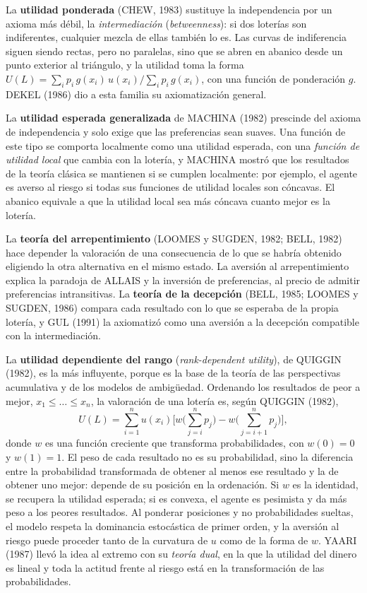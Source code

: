 \documentclass[10pt,a4paper]{article}
\begin{document}
La \textbf{utilidad ponderada} (CHEW, 1983) sustituye la independencia por un axioma más débil, la \textit{intermediación} (\textit{betweenness}): si dos loterías son indiferentes, cualquier mezcla de ellas también lo es. Las curvas de indiferencia siguen siendo rectas, pero no paralelas, sino que se abren en abanico desde un punto exterior al triángulo, y la utilidad toma la forma $U(L)=\sum_ip_i\,g(x_i)\,u(x_i)\big/\sum_ip_i\,g(x_i)$, con una función de ponderación $g$. DEKEL (1986) dio a esta familia su axiomatización general.

La \textbf{utilidad esperada generalizada} de MACHINA (1982) prescinde del axioma de independencia y solo exige que las preferencias sean suaves. Una función de este tipo se comporta localmente como una utilidad esperada, con una \textit{función de utilidad local} que cambia con la lotería, y MACHINA mostró que los resultados de la teoría clásica se mantienen si se cumplen localmente: por ejemplo, el agente es averso al riesgo si todas sus funciones de utilidad locales son cóncavas. El abanico equivale a que la utilidad local sea más cóncava cuanto mejor es la lotería.

La \textbf{teoría del arrepentimiento} (LOOMES y SUGDEN, 1982; BELL, 1982) hace depender la valoración de una consecuencia de lo que se habría obtenido eligiendo la otra alternativa en el mismo estado. La aversión al arrepentimiento explica la paradoja de ALLAIS y la inversión de preferencias, al precio de admitir preferencias intransitivas. La \textbf{teoría de la decepción} (BELL, 1985; LOOMES y SUGDEN, 1986) compara cada resultado con lo que se esperaba de la propia lotería, y GUL (1991) la axiomatizó como una aversión a la decepción compatible con la intermediación.

La \textbf{utilidad dependiente del rango} (\textit{rank-dependent utility}), de QUIGGIN (1982), es la más influyente, porque es la base de la teoría de las perspectivas acumulativa y de los modelos de ambigüedad. Ordenando los resultados de peor a mejor, $x_1\leq\dots\leq x_n$, la valoración de una lotería es, según QUIGGIN (1982),
$$U(L)=\sum_{i=1}^{n}u(x_i)\Big[w\Big(\sum_{j=i}^{n}p_j\Big)-w\Big(\sum_{j=i+1}^{n}p_j\Big)\Big],$$
donde $w$ es una función creciente que transforma probabilidades, con $w(0)=0$ y $w(1)=1$. El peso de cada resultado no es su probabilidad, sino la diferencia entre la probabilidad transformada de obtener al menos ese resultado y la de obtener uno mejor: depende de su posición en la ordenación. Si $w$ es la identidad, se recupera la utilidad esperada; si es convexa, el agente es pesimista y da más peso a los peores resultados. Al ponderar posiciones y no probabilidades sueltas, el modelo respeta la dominancia estocástica de primer orden, y la aversión al riesgo puede proceder tanto de la curvatura de $u$ como de la forma de $w$. YAARI (1987) llevó la idea al extremo con su \textit{teoría dual}, en la que la utilidad del dinero es lineal y toda la actitud frente al riesgo está en la transformación de las probabilidades.
\end{document}
